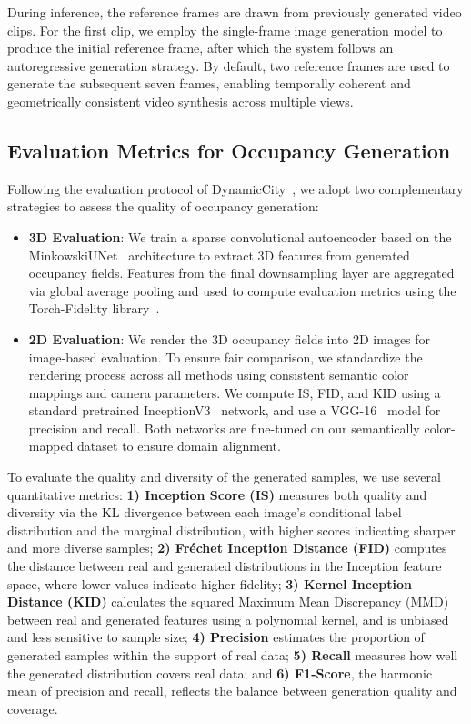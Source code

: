 During inference, the reference frames are drawn from previously generated video clips. For the first clip, we employ the single-frame image generation model to produce the initial reference frame, after which the system follows an autoregressive generation strategy. By default, two reference frames are used to generate the subsequent seven frames, enabling temporally coherent and geometrically consistent video synthesis across multiple views.

\subsection{Evaluation Metrics for Occupancy Generation}
Following the evaluation protocol of DynamicCity~\cite{DynamicCity}, we adopt two complementary strategies to assess the quality of occupancy generation:
\vspace{-2mm}
\begin{itemize}
[align=right,labelsep=2pt,labelwidth=1em,leftmargin=*,itemindent=1pt]
    \item \textbf{3D Evaluation}: We train a sparse convolutional autoencoder based on the MinkowskiUNet~\cite{Mink} architecture to extract 3D features from generated occupancy fields. Features from the final downsampling layer are aggregated via global average pooling and used to compute evaluation metrics using the Torch-Fidelity library~\cite{TorchFidelity}.
    \item \textbf{2D Evaluation}: We render the 3D occupancy fields into 2D images for image-based evaluation. To ensure fair comparison, we standardize the rendering process across all methods using consistent semantic color mappings and camera parameters. We compute IS, FID, and KID using a standard pretrained InceptionV3~\cite{InceptionV3} network, and use a VGG-16~\cite{VGG16} model for precision and recall. Both networks are fine-tuned on our semantically color-mapped dataset to ensure domain alignment.
\end{itemize}

To evaluate the quality and diversity of the generated samples, we use several quantitative metrics: \textbf{1) Inception Score (IS)} measures both quality and diversity via the KL divergence between each image’s conditional label distribution and the marginal distribution, with higher scores indicating sharper and more diverse samples; \textbf{2) Fréchet Inception Distance (FID)} computes the distance between real and generated distributions in the Inception feature space, where lower values indicate higher fidelity; \textbf{3) Kernel Inception Distance (KID)} calculates the squared Maximum Mean Discrepancy (MMD) between real and generated features using a polynomial kernel, and is unbiased and less sensitive to sample size; \textbf{4) Precision} estimates the proportion of generated samples within the support of real data; \textbf{5) Recall} measures how well the generated distribution covers real data; and \textbf{6) F1-Score}, the harmonic mean of precision and recall, reflects the balance between generation quality and coverage.

